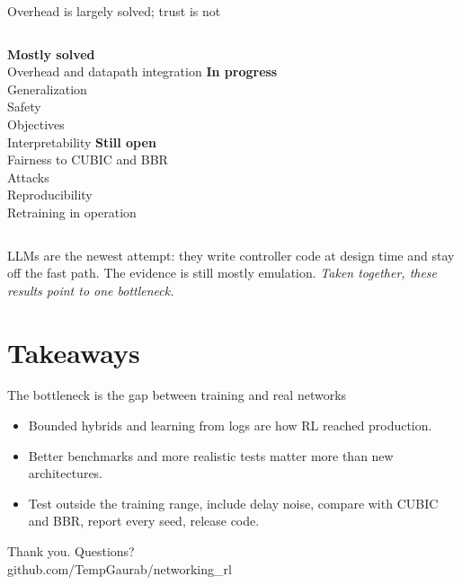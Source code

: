 \documentclass[aspectratio=169,12pt]{beamer}
\newcommand{\bridge}[1]{\vfill{\small\color{accent}\textit{#1}}\vskip2pt}
\begin{document}
\begin{frame}{Overhead is largely solved; trust is not}
\begin{columns}[T]
\textbf{Mostly solved}\\[2mm]
\small Overhead and datapath integration
\textbf{In progress}\\[2mm]
\small Generalization\\ Safety\\ Objectives\\ Interpretability
\textbf{Still open}\\[2mm]
\small Fairness to CUBIC and BBR\\ Attacks\\ Reproducibility\\ Retraining in operation
\end{columns}
\vspace{7mm}
\centering
LLMs are the newest attempt: they write controller code at design time and stay off the fast path. The evidence is still mostly emulation.
\bridge{Taken together, these results point to one bottleneck.}
\end{frame}

\section{Takeaways}

\begin{frame}{The bottleneck is the gap between training and real networks}
\begin{itemize}\setlength\itemsep{5mm}
  \item Bounded hybrids and learning from logs are how RL reached production.
  \item Better benchmarks and more realistic tests matter more than new architectures.
  \item Test outside the training range, include delay noise, compare with CUBIC and BBR, report every seed, release code.
\end{itemize}
\vspace{6mm}
\centering\large Thank you. Questions?\\[1mm]
{\small\color{muted} github.com/TempGaurab/networking\_rl}
\end{frame}
\end{document}
